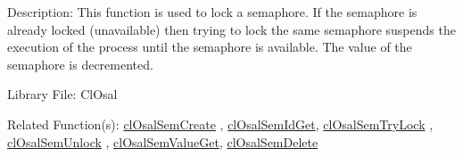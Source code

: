 \begin{Desc}
\item[Description:]This function is used to lock a semaphore. If the semaphore is already locked (unavailable) then trying to lock the same semaphore suspends the execution of the process until the semaphore is available. The value of the semaphore is decremented.\end{Desc}
\begin{Desc}
\item[Library File:]Cl\-Osal\end{Desc}
\begin{Desc}
\item[Related Function(s):]\hyperlink{pageosal132}{cl\-Osal\-Sem\-Create} , \hyperlink{pageosal133}{cl\-Osal\-Sem\-Id\-Get}, 
\hyperlink{pageosal135}{cl\-Osal\-Sem\-Try\-Lock} , \hyperlink{pageosal136}{cl\-Osal\-Sem\-Unlock} , 
\hyperlink{pageosal137}{cl\-Osal\-Sem\-Value\-Get}, \hyperlink{pageosal138}{cl\-Osal\-Sem\-Delete} \end{Desc}

\newpage
